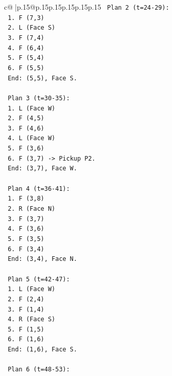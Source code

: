 \documentclass{article}
\begin{document}
{\begin{supertabular}{c@{$\;$}|p{.15\linewidth}@{}p{.15\linewidth}p{.15\linewidth}p{.15\linewidth}p{.15\linewidth}p{.15\linewidth}}
{{{\texttt{       Plan 2 (t=24{-}29):} \\
\texttt{       1. F (7,3)} \\
\texttt{       2. L (Face S)} \\
\texttt{       3. F (7,4)} \\
\texttt{       4. F (6,4)} \\
\texttt{       5. F (5,4)} \\
\texttt{       6. F (5,5)} \\
\texttt{       End: (5,5), Face S.} \\
\\ 
\texttt{       Plan 3 (t=30{-}35):} \\
\texttt{       1. L (Face W)} \\
\texttt{       2. F (4,5)} \\
\texttt{       3. F (4,6)} \\
\texttt{       4. L (Face W)} \\
\texttt{       5. F (3,6)} \\
\texttt{       6. F (3,7) {-}> Pickup P2.} \\
\texttt{       End: (3,7), Face W.} \\
\\ 
\texttt{       Plan 4 (t=36{-}41):} \\
\texttt{       1. F (3,8)} \\
\texttt{       2. R (Face N)} \\
\texttt{       3. F (3,7)} \\
\texttt{       4. F (3,6)} \\
\texttt{       5. F (3,5)} \\
\texttt{       6. F (3,4)} \\
\texttt{       End: (3,4), Face N.} \\
\\ 
\texttt{       Plan 5 (t=42{-}47):} \\
\texttt{       1. L (Face W)} \\
\texttt{       2. F (2,4)} \\
\texttt{       3. F (1,4)} \\
\texttt{       4. R (Face S)} \\
\texttt{       5. F (1,5)} \\
\texttt{       6. F (1,6)} \\
\texttt{       End: (1,6), Face S.} \\
\\ 
\texttt{       Plan 6 (t=48{-}53):} \\
}}}
\end{supertabular}}
\end{document}
